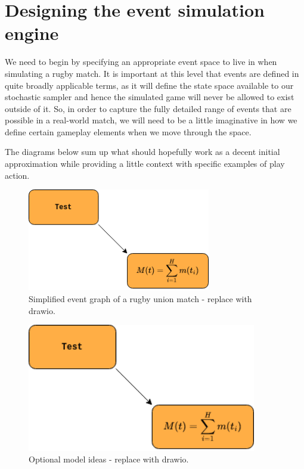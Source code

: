 \documentclass{book}
\begin{document}
\section{\sffamily Designing the event simulation engine}

We need to begin by specifying an appropriate event space to live in when simulating a rugby match. It is important at this level that events are defined in quite broadly applicable terms, as it will define the state space available to our stochastic sampler and hence the simulated game will never be allowed to exist outside of it. So, in order to capture the fully detailed range of events that are possible in a real-world match, we will need to be a little imaginative in how we define certain gameplay elements when we move through the space.

The diagrams below sum up what should hopefully work as a decent initial approximation while providing a little context with specific examples of play action.

\begin{figure}[h]
\includegraphics[width=8cm]{images/test.drawio.png}
\caption{Simplified event graph of a rugby union match - replace with drawio.}
\label{fig:event-graph}
\end{figure}

\begin{figure}[h]
\includegraphics[width=10cm]{images/test.drawio.png}
\caption{Optional model ideas - replace with drawio.}
\label{fig:model-ideas}
\end{figure}
\end{document}
